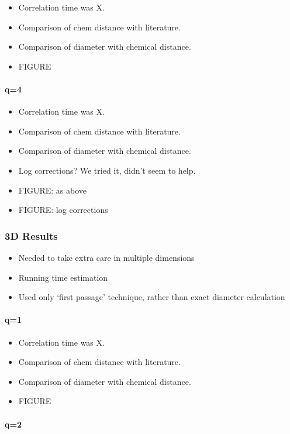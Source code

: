 \documentclass{article}
\begin{document}
\begin{itemize}
\item Correlation time was X.
\item Comparison of chem distance with literature.
\item Comparison of diameter with chemical distance.
\item FIGURE
\end{itemize}
\paragraph{q=4}
\label{sec-2.3.1.4}

\begin{itemize}
\item Correlation time was X.
\item Comparison of chem distance with literature.
\item Comparison of diameter with chemical distance.
\item Log corrections? We tried it, didn't seem to help.
\item FIGURE: as above
\item FIGURE: log corrections
\end{itemize}
\subsubsection{3D Results}
\label{sec-2.3.2}

\begin{itemize}
\item Needed to take extra care in multiple dimensions
\item Running time estimation
\item Used only `first passage' technique, rather than exact diameter
  calculation
\end{itemize}
\paragraph{q=1}
\label{sec-2.3.2.1}

\begin{itemize}
\item Correlation time was X.
\item Comparison of chem distance with literature.
\item Comparison of diameter with chemical distance.
\item FIGURE
\end{itemize}
\paragraph{q=2}
\label{sec-2.3.2.2}
\end{document}
